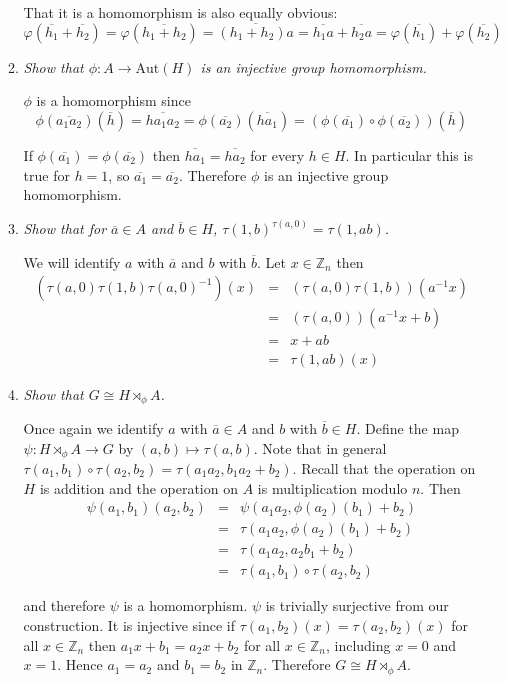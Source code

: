 \documentclass[letterpaper, 11pt]{article}
\newcommand{\Aut}{\text{Aut}}
\newcommand{\Z}{\mathbb{Z}}
\begin{document}
\begin{enumerate}
\begin{enumerate}
That it is a homomorphism is also equally obvious:
\[
\varphi\left(\overline{h_1} + \overline{h_2}\right) = \varphi\left(\overline{h_1 + h_2}\right) = \overline{(h_1+h_2)a} = \overline{h_1a} + \overline{h_2a} = \varphi\left(\overline{h_1}\right) + \varphi\left(\overline{h_2}\right)
\]
\item \emph{Show that $\phi: A \rightarrow \Aut(H)$ is an injective group homomorphism.}

$\phi$ is a homomorphism since
\[
\phi\left(\overline{a_1a_2}\right)\left(\overline{h}\right) = \overline{ha_1a_2} = \phi\left(\overline{a_2}\right)\left(\overline{ha_1}\right) = \left(\phi\left(\overline{a_1}\right) \circ \phi\left(\overline{a_2}\right)\right)\left(\overline{h}\right)
\]

If $\phi\left(\overline{a_1}\right) = \phi\left(\overline{a_2}\right)$ then $\overline{ha_1} = \overline{ha_2}$ for every $h \in H$.  In particular this is true for $h = 1$, so $\overline{a_1} = \overline{a_2}$.  Therefore $\phi$ is an injective group homomorphism.

\item \emph{Show that for $\overline{a} \in A$ and $\overline{b} \in H$, $\tau(1,b)^{\tau(a,0)} = \tau(1,ab)$.}

We will identify $a$ with $\overline{a}$ and $b$ with $\overline{b}$.  Let $x \in \Z_n$ then
\begin{eqnarray*}
\left(\tau(a,0)\tau(1,b)\tau(a,0)^{-1}\right)(x) &=& \left(\tau(a,0)\tau(1,b)\right)\left(a^{-1}x\right) \\
&=&  \left(\tau(a,0)\right)\left(a^{-1}x+b\right) \\
&=& x+ab \\
&=& \tau(1,ab)(x)
\end{eqnarray*}
\item \emph{Show that $G \cong H \rtimes_\phi A$.}

Once again we identify $a$ with $\overline{a} \in A$ and $b$ with $\overline{b} \in H$.  Define the map $\psi: H \rtimes_\phi A \rightarrow G$ by $(a,b) \mapsto \tau(a,b)$.  Note that in general $\tau(a_1, b_1) \circ \tau(a_2,b_2) = \tau(a_1a_2, b_1a_2 + b_2)$.  Recall that the operation on $H$ is addition and the operation on $A$ is multiplication modulo $n$.  Then
\begin{eqnarray*}
\psi(a_1,b_1)(a_2,b_2) &=& \psi(a_1a_2, \phi(a_2)(b_1) + b_2) \\
&=& \tau(a_1a_2, \phi(a_2)(b_1) + b_2) \\
&=& \tau(a_1a_2, a_2b_1 + b_2) \\
&=& \tau(a_1, b_1) \circ \tau(a_2,b_2)
\end{eqnarray*} 

and therefore $\psi$ is a homomorphism.  $\psi$ is trivially surjective from our construction.  It is injective since if $\tau(a_1,b_2)(x) = \tau(a_2,b_2)(x)$ for all $x \in \Z_n$ then $a_1x+b_1 = a_2x+b_2$ for all $x \in \Z_n$, including $x=0$ and $x=1$.  Hence $a_1 = a_2$ and $b_1 = b_2$ in $\Z_n$.  Therefore $G \cong H \rtimes_\phi A$.
\end{enumerate}
\end{enumerate}
\end{document}
